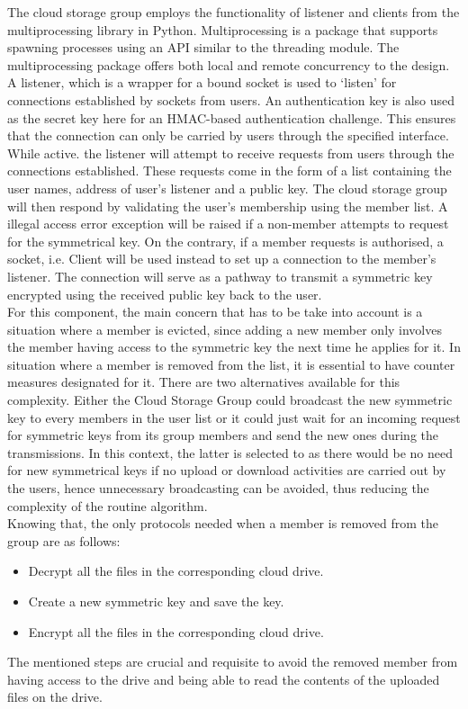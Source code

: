 \documentclass[12pt]{article}
\begin{document}
The cloud storage group employs the functionality of listener and clients from the multiprocessing library in Python. Multiprocessing is a package that supports spawning processes using an API similar to the threading module. The multiprocessing package offers both local and remote concurrency to the design. A listener, which is a wrapper for a bound socket is used to ‘listen’ for connections established by sockets from users. An authentication key is also used as the secret key here for an HMAC-based authentication challenge. This ensures that the connection can only be carried by users through the specified interface. \\

While active. the listener will attempt to receive requests from users through the connections established. These requests come in the form of a list containing the user names, address of user's listener and a public key. The cloud storage group will then respond by validating the user's membership using the member list. A illegal access error exception will be raised if a non-member attempts to request for the symmetrical key. On the contrary, if a member requests is authorised, a socket, i.e. Client will be used instead to set up a connection to the member's listener. The connection will serve as a pathway to transmit a symmetric key encrypted using the received public key back to the user. \\

For this component, the main concern that has to be take into account is a situation where a member is evicted, since adding a new member only involves the member having access to the symmetric key the next time he applies for it. In situation where a member is removed from the list, it is essential to have counter measures designated for it. There are two alternatives available for this complexity. Either the Cloud Storage Group could broadcast the new symmetric key to every members in the user list or it could just wait for an incoming request for symmetric keys from its group members and send the new ones during the transmissions. In this context, the latter is selected to as there would be no need for new symmetrical keys if no upload or download activities are carried out by the users, hence unnecessary broadcasting can be avoided, thus reducing the complexity of the routine algorithm. \\

Knowing that, the only protocols needed when a member is removed from the group are as follows:
\begin{itemize}
\item Decrypt all the files in the corresponding cloud drive.
\item Create a new symmetric key and save the key.
\item Encrypt all the files in the corresponding cloud drive.
\end{itemize}
The mentioned steps are crucial and requisite to avoid the removed member from having access to the drive and being able to read the contents of the uploaded files on the drive.
\vspace*{10mm}
\end{document}
